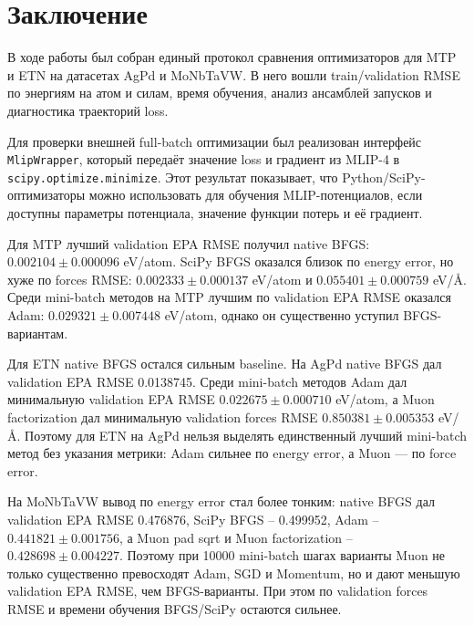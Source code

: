 \documentclass[a4paper,12pt]{extarticle}
\begin{document}
\newpage







\section{Заключение}
\label{sec:conclusion}

В ходе работы был собран единый протокол сравнения оптимизаторов для MTP и ETN на датасетах AgPd и MoNbTaVW. В него вошли train/validation RMSE по энергиям на атом и силам, время обучения, анализ ансамблей запусков и диагностика траекторий loss.

Для проверки внешней full-batch оптимизации был реализован интерфейс \texttt{MlipWrapper}, который передаёт значение loss и градиент из MLIP-4 в \texttt{scipy.optimize.minimize}. Этот результат показывает, что Python/SciPy-оптимизаторы можно использовать для обучения MLIP-потенциалов, если доступны параметры потенциала, значение функции потерь и её градиент.

Для MTP лучший validation EPA RMSE получил native BFGS: \(0.002104 \pm 0.000096\) eV/atom. SciPy BFGS оказался близок по energy error, но хуже по forces RMSE: \(0.002333 \pm 0.000137\) eV/atom и \(0.055401 \pm 0.000759\) eV/\AA. Среди mini-batch методов на MTP лучшим по validation EPA RMSE оказался Adam: \(0.029321 \pm 0.007448\) eV/atom, однако он существенно уступил BFGS-вариантам.

Для ETN native BFGS остался сильным baseline. На AgPd native BFGS дал validation EPA RMSE 0.0138745. Среди mini-batch методов Adam дал минимальную validation EPA RMSE \(0.022675 \pm 0.000710\) eV/atom, а Muon factorization дал минимальную validation forces RMSE \(0.850381 \pm 0.005353\) eV/\AA. Поэтому для ETN на AgPd нельзя выделять единственный лучший mini-batch метод без указания метрики: Adam сильнее по energy error, а Muon --- по force error.

На MoNbTaVW вывод по energy error стал более тонким: native BFGS дал validation EPA RMSE 0.476876, SciPy BFGS -- 0.499952, Adam -- \(0.441821 \pm 0.001756\), а Muon pad sqrt и Muon factorization -- \(0.428698 \pm 0.004227\). Поэтому при 10000 mini-batch шагах варианты Muon не только существенно превосходят Adam, SGD и Momentum, но и дают меньшую validation EPA RMSE, чем BFGS-варианты. При этом по validation forces RMSE и времени обучения BFGS/SciPy остаются сильнее.
\end{document}
